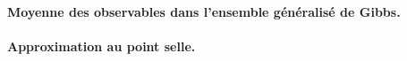 \paragraph{Moyenne des observables dans l’ensemble généralisé de Gibbs.}




\paragraph{Approximation au point selle.}


